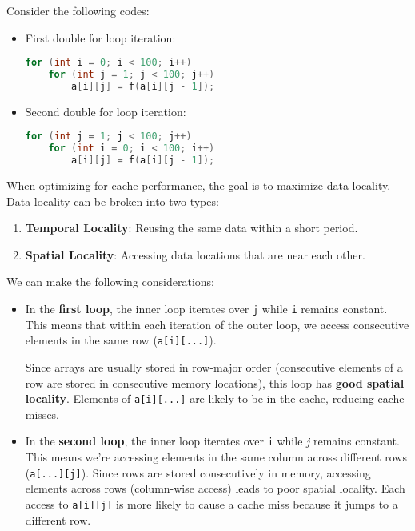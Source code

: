 \begin{examplebox}
    Consider the following codes:
    \begin{itemize}
        \item First double for loop iteration:
        \begin{lstlisting}[language=c]
for (int i = 0; i < 100; i++)
    for (int j = 1; j < 100; j++)
        a[i][j] = f(a[i][j - 1]);\end{lstlisting}
        \item Second double for loop iteration:
        \begin{lstlisting}[language=c]
for (int j = 1; j < 100; j++)
    for (int i = 0; i < 100; i++)
        a[i][j] = f(a[i][j - 1]);\end{lstlisting}
    \end{itemize}
    \begin{remarkbox}[: Cache]
        When optimizing for cache performance, the goal is to maximize data locality. Data locality can be broken into two types:
        \begin{enumerate}
            \item \textbf{Temporal Locality}: Reusing the same data within a short period.
            \item \textbf{Spatial Locality}: Accessing data locations that are near each other.
        \end{enumerate}
    \end{remarkbox}

    We can make the following considerations:
    \begin{itemize}
        \item[\textcolor{Green3}{\faIcon{check}}] In the \textbf{first loop}, the inner loop iterates over \texttt{j} while \texttt{i} remains constant. This means that within each iteration of the outer loop, we access consecutive elements in the same row (\texttt{a[i][...]}).
        
        Since arrays are usually stored in row-major order (consecutive elements of a row are stored in consecutive memory locations), this loop has \textbf{good spatial locality}. Elements of \texttt{a[i][...]} are likely to be in the cache, reducing cache misses.


        \item[\textcolor{Red2}{\faIcon{times}}] In the \textbf{second loop}, the inner loop iterates over \texttt{i} while \textsl{j} remains constant. This means we're accessing elements in the same column across different rows (\texttt{a[...][j]}). Since rows are stored consecutively in memory, accessing elements across rows (column-wise access) leads to poor spatial locality. Each access to \texttt{a[i][j]} is more likely to cause a cache miss because it jumps to a different row.
    \end{itemize}
\end{examplebox}

